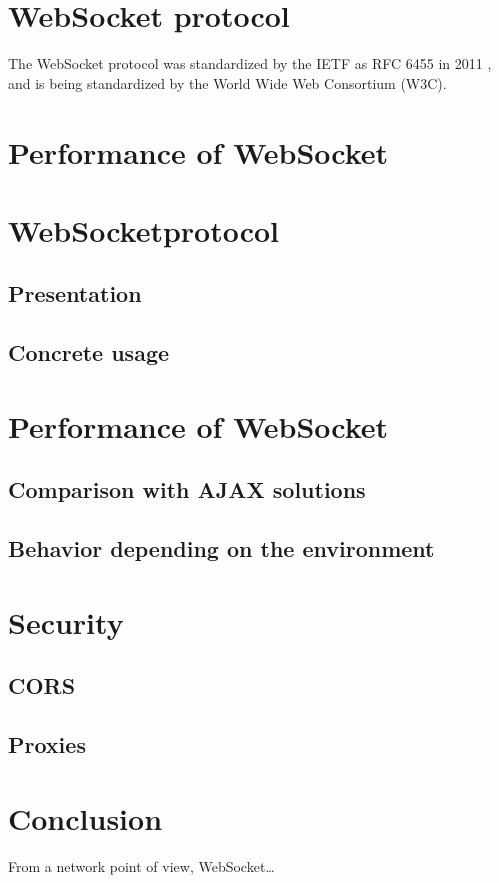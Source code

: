 \documentclass[journal,compsoc]{IEEEtran}
\newcommand{\ws}{WebSocket}
\begin{document}
\section{\ws{} protocol}
The \ws{} protocol was standardized by the IETF as RFC 6455 in 2011 \cite{rfc6455}, and is being standardized by the World Wide Web Consortium (W3C).

 

\section{Performance of WebSocket}


\section{\ws protocol}



\subsection{Presentation}

\subsection{Concrete usage}

\section{Performance of \ws}

\subsection{Comparison with AJAX solutions}

\subsection{Behavior depending on the environment}

\section{Security}

\subsection{CORS}

\subsection{Proxies}

\section{Conclusion}

From a network point of view, \ws …


\ifCLASSOPTIONcaptionsoff
  \newpage
\fi




\end{document}
